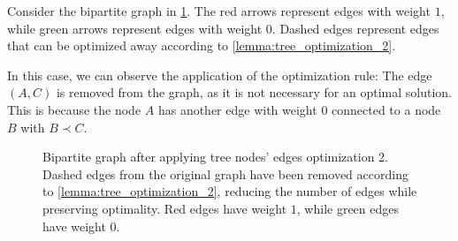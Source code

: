 \begin{example}
    Consider the bipartite graph in \cref{fig:tree_optimization_2}. The red arrows represent edges with weight $1$, while green arrows represent edges with weight $0$. Dashed edges represent edges that can be optimized away according to \cref{lemma:tree_optimization_2}.

    In this case, we can observe the application of the optimization rule: The edge $(A, C)$ is removed from the graph, as it is not necessary for an optimal solution. This is because the node $A$ has another edge with weight $0$ connected to a node $B$ with $B \prec C$.
    \begin{figure}[H]
        \centering
        \caption{Bipartite graph after applying tree nodes' edges optimization 2. Dashed edges from the original graph have been removed according to \cref{lemma:tree_optimization_2}, reducing the number of edges while preserving optimality. Red edges have weight $1$, while green edges have weight $0$.}
        \label{fig:tree_optimization_2}
    \end{figure}
\end{example}

